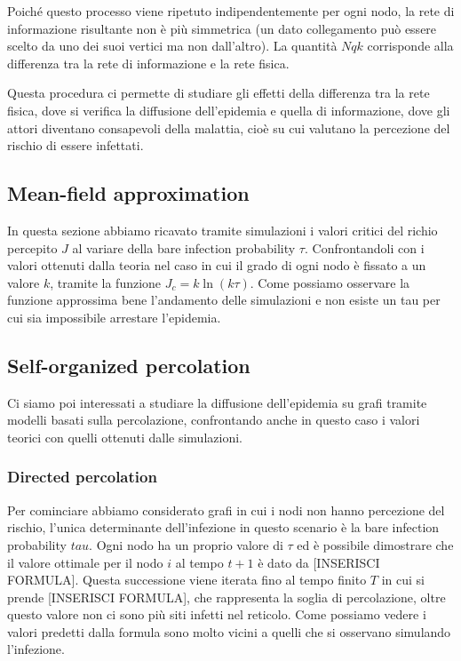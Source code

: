 Poiché questo processo viene ripetuto indipendentemente per ogni nodo, la rete di informazione risultante non è più
simmetrica (un dato collegamento può essere scelto da uno dei suoi vertici ma non dall'altro).
La quantità $Nqk$ corrisponde alla differenza tra la rete di informazione e la rete fisica.

Questa procedura ci permette di studiare gli effetti della differenza tra la rete fisica, dove si verifica la
diffusione dell'epidemia e quella di informazione, dove gli attori diventano consapevoli della malattia,
cioè su cui valutano la percezione del rischio di essere infettati.

\subsection{Mean-field approximation}\label{subsec:mean-field-approximation}
In questa sezione abbiamo ricavato tramite simulazioni i valori critici del richio percepito $J$
al variare della bare infection probability $\tau$. Confrontandoli con i valori ottenuti dalla teoria nel caso
in cui il grado di ogni nodo è fissato a  un valore $k$, tramite la funzione $J_{c}=k\ln(k\tau)$.
Come possiamo osservare la funzione approssima bene l'andamento delle simulazioni e non esiste un tau per cui 
sia impossibile arrestare l'epidemia. 
\subsection{Self-organized percolation}\label{subsec:self-organized-percolation}
Ci siamo poi interessati a studiare la diffusione dell'epidemia su grafi tramite modelli basati 
sulla percolazione, confrontando anche in questo caso i valori teorici con quelli ottenuti dalle simulazioni.

\subsubsection{Directed percolation}\label{subsubsec:directed-percolation}
Per cominciare abbiamo considerato grafi in cui i nodi non hanno percezione del rischio, l'unica determinante 
dell'infezione in questo scenario è la bare infection probability $tau$. Ogni nodo ha un proprio valore di $\tau$
ed è possibile dimostrare che il valore ottimale per il nodo $i$ al tempo $t+1$ è dato da [INSERISCI FORMULA].
Questa successione viene iterata fino al tempo finito $T$ in cui si prende [INSERISCI FORMULA], che 
rappresenta la soglia di percolazione, oltre questo valore non ci sono più siti infetti nel reticolo.
Come possiamo vedere i valori predetti dalla formula sono molto vicini a quelli che si osservano simulando 
l'infezione.
